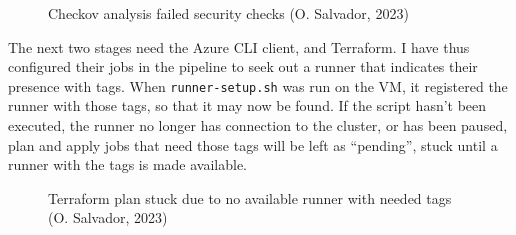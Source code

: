 \documentclass[11pt]{article}
\begin{document}
\begin{flushleft}
        \begin{figure}[htb]
            \centering
            \caption{Checkov analysis failed security checks (O. Salvador, 2023)}
        \end{figure}

    The next two stages need the Azure CLI client, and Terraform. I have thus configured their jobs in the pipeline to seek out a runner that indicates their presence with tags. When \texttt{runner-setup.sh} was run on the VM, it registered the runner with those tags, so that it may now be found. If the script hasn't been executed, the runner no longer has connection to the cluster, or has been paused, plan and apply jobs that need those tags will be left as ``pending'', stuck until a runner with the tags is made available.
    \linebreak
    
        \begin{figure}[htb]
            \centering
            \caption{Terraform plan stuck due to no available runner with needed tags (O. Salvador, 2023)}
        \end{figure}









\end{flushleft}
\end{document}
